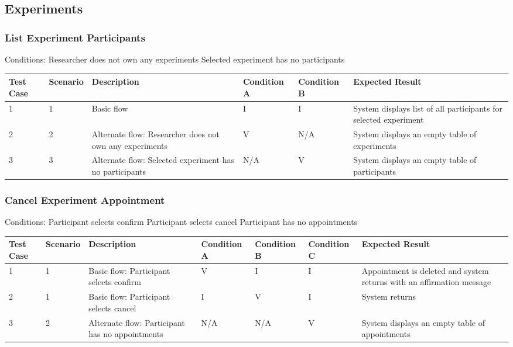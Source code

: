 \subsection{Experiments}
\subsubsection{List Experiment Participants}
\begin{outline}[enumerate]
\1 [] Conditions:
\2 [A] Researcher does not own any experiments
\2 [B] Selected experiment has no participants
\end{outline}
\begin{table}[!h]
    \begin{tabular}{|p{.6in}|p{.5in}|p{2.5in}|p{.8in}|p{.8in}|p{2.5in}|}
        \hline
        Test Case & Scenario & Description & Condition A & Condition B & Expected Result \\ \hline
        1 & 1 & Basic flow & I & I & System displays list of all participants for selected experiment \\ \hline
        2 & 2 & Alternate flow: Researcher does not own any experiments & V & N/A & System displays an empty table of experiments \\ \hline
        3 & 3 & Alternate flow: Selected experiment has no participants & N/A & V & System displays an empty table of participants \\ \hline
    \end{tabular}
\end{table}

\subsubsection{Cancel Experiment Appointment}
\begin{outline}[enumerate]
\1 [] Conditions:
\2 [A] Participant selects confirm
\2 [B] Participant selects cancel
\2 [C] Participant has no appointments
\end{outline}
\begin{table}[!h]
    \begin{tabular}{|p{.6in}|p{.5in}|p{2.25in}|p{.8in}|p{.8in}|p{.8in}|p{2.25in}|}
        \hline
        Test Case & Scenario & Description & Condition A & Condition B & Condition C & Expected Result \\ \hline
        1 & 1 & Basic flow: Participant selects confirm & V & I & I & Appointment is deleted and system returns with an affirmation message \\ \hline
        2 & 1 & Basic flow: Participant selects cancel & I & V & I & System returns \\ \hline
        3 & 2 & Alternate flow: Participant has no appointments & N/A & N/A & V & System displays an empty table of appointments \\ \hline
    \end{tabular}
\end{table}